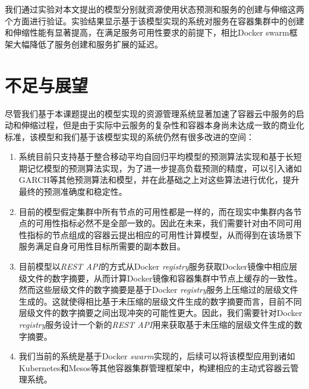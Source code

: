 我们通过实验对本文提出的模型分别就资源使用状态预测和服务的创建与伸缩这两个方面进行验证。实验结果显示基于该模型实现的系统对服务在容器集群中的创建和伸缩性能有显著提高，在满足服务可用性要求的前提下，相比Docker swarm框架大幅降低了服务创建和服务扩展的延迟。

\section{不足与展望}
尽管我们基于本课题提出的模型实现的资源管理系统显著加速了容器云中服务的启动和伸缩过程，但是由于实际中云服务的复杂性和容器本身尚未达成一致的商业化标准，该模型和我们基于该模型实现的系统仍然有很多改进的空间：
\begin{enumerate}
\item 系统目前只支持基于整合移动平均自回归平均模型的预测算法实现和基于长短期记忆模型的预测算法实现，为了进一步提高负载预测的精度，可以引入诸如GARCH等其他预测算法和模型，并在此基础之上对这些算法进行优化，提升最终的预测准确度和稳定性。
\item 目前的模型假定集群中所有节点的可用性都是一样的，而在现实中集群内各节点的可用性指标必然不是全部一致的。因此在未来，我们需要针对由不同可用性指标的节点组成的容器云提出相应的可用性计算模型，从而得到在该场景下服务满足自身可用性目标所需要的副本数目。
\item 目前模型以\emph{REST API}的方式从Docker \emph{registry}服务获取Docker镜像中相应层级文件的数字摘要，从而计算Docker镜像和容器集群中节点上缓存的一致性。然而这些层级文件的数字摘要是基于Docker \emph{registry}服务上压缩过的层级文件生成的。这就使得相比基于未压缩的层级文件生成的数字摘要而言，目前不同层级文件的数字摘要之间出现冲突的可能性更大。因此，我们需要针对Docker \emph{registry}服务设计一个新的\emph{REST API}用来获取基于未压缩的层级文件生成的数字摘要。
\item 我们当前的系统是基于Docker \emph{swarm}实现的，后续可以将该模型应用到诸如Kubernetes和Mesos等其他容器集群管理框架中，构建相应的主动式容器云管理系统。
\end{enumerate}
